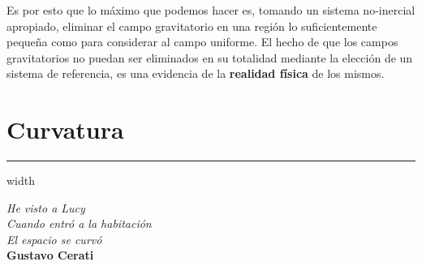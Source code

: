 Es por esto que lo máximo que podemos hacer es, tomando un sistema no-inercial apropiado, eliminar el campo gravitatorio en una región lo suficientemente pequeña como para considerar al campo uniforme. El hecho de que los campos gravitatorios no puedan ser eliminados en su totalidad mediante la elección de un sistema de referencia, es una evidencia de la \textbf{realidad física} de los mismos.
\newpage
\section{\huge{Curvatura}}

\textcolor{myred}{\hrule width\textwidth}

\begin{flushright}
\textit{He visto a Lucy\\ Cuando entró a la habitación\\ El espacio se curvó}\\ \textbf{Gustavo Cerati}
\end{flushright}

